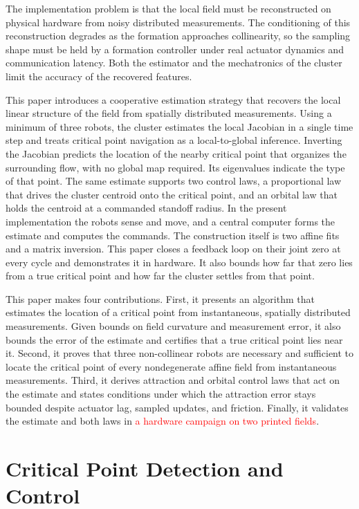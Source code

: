 \documentclass[lettersize,journal]{IEEEtran}
\newcommand{\syn}[1]{\textcolor{red}{#1}}            %
\begin{document}
The implementation problem is that the local field must be reconstructed on physical hardware from noisy distributed measurements. The conditioning of this reconstruction degrades as the formation approaches collinearity, so the sampling shape must be held by a formation controller under real actuator dynamics and communication latency. Both the estimator and the mechatronics of the cluster limit the accuracy of the recovered features.

This paper introduces a cooperative estimation strategy that recovers the local linear structure of the field from spatially distributed measurements. Using a minimum of three robots, the cluster estimates the local Jacobian in a single time step and treats critical point navigation as a local-to-global inference. Inverting the Jacobian predicts the location of the nearby critical point that organizes the surrounding flow, with no global map required. Its eigenvalues indicate the type of that point. The same estimate supports two control laws, a proportional law that drives the cluster centroid onto the critical point, and an orbital law that holds the centroid at a commanded standoff radius. In the present implementation the robots sense and move, and a central computer forms the estimate and computes the commands. The construction itself is two affine fits and a matrix inversion. This paper closes a feedback loop on their joint zero at every cycle and demonstrates it in hardware. It also bounds how far that zero lies from a true critical point and how far the cluster settles from that point.

This paper makes four contributions. First, it presents an algorithm that estimates the location of a critical point from instantaneous, spatially distributed measurements. Given bounds on field curvature and measurement error, it also bounds the error of the estimate and certifies that a true critical point lies near it. Second, it proves that three non-collinear robots are necessary and sufficient to locate the critical point of every nondegenerate affine field from instantaneous measurements. Third, it derives attraction and orbital control laws that act on the estimate and states conditions under which the attraction error stays bounded despite actuator lag, sampled updates, and friction. Finally, it validates the estimate and both laws in \syn{a hardware campaign on two printed fields}. %


\section{Critical Point Detection and Control}
\end{document}
